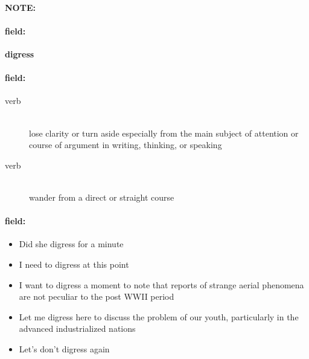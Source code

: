 \documentclass[12pt]{article}
\newenvironment{note}{\paragraph{NOTE:}}{}
\newenvironment{field}{\paragraph{field:}}{}
\begin{document}
\begin{note}
\begin{field}
\textbf{\large digress}
\end{field}


\begin{field}
\begin{description}
\item[verb] \hfill \\ 
lose clarity or turn aside especially from the main subject of attention or course of argument in writing, thinking, or speaking

\item[verb] \hfill \\ 
wander from a direct or straight course

\end{description}
\end{field}

\begin{field}
\begin{itemize}
\item Did she digress for a minute
\item I need to digress at this point
\item I want to digress a moment to note that reports of strange aerial phenomena are not peculiar to the post WWII period
\item Let me digress here to discuss the problem of our youth, particularly in the advanced industrialized nations
\item Let's don't digress again
\end{itemize}
\end{field}
\end{note}
\end{document}
